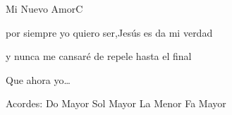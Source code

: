 \documentclass[12pt, spanish]{book}
\begin{document}
\begin{song}{Mi Nuevo Amor}{C}
\begin{SBOpGroup}
            por siempre yo quiero ser,Jesús es da mi verdad

            y nunca  me cansaré de repele hasta el final

            Que ahora yo\ldots
        \end{SBOpGroup}

        \ifChordBk
        \begin{SBOpGroup}
            Acordes:
            \upchord{\C}\qquad Do Mayor \hfill
            \upchord{\G}\qquad Sol Mayor \hfill\null\break
            \upchord{\Am}\qquad La Menor \hfill
            \upchord{\F}\qquad Fa Mayor \hfill\null\break
        \end{SBOpGroup}
        \fi
    \end{song}
\end{document}
